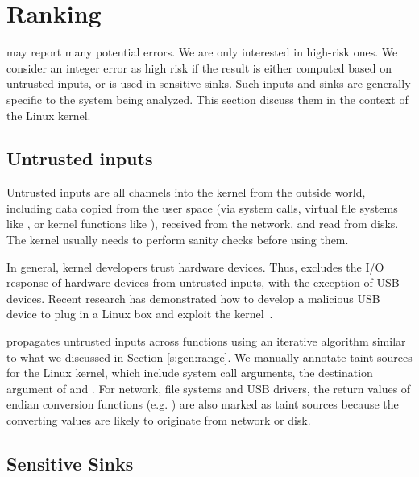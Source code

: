 \section{Ranking}
\label{s:rank}

\sys may report many potential errors.  We are only interested
in high-risk ones.  We consider an integer error as high risk if the
result is either computed based on untrusted inputs, or is used in
sensitive sinks.  Such inputs and sinks are generally specific to
the system being analyzed.  This section discuss them in the context
of the Linux kernel.

\subsection{Untrusted inputs}

Untrusted inputs are all channels into the kernel from the outside world,
including data copied from the user space (via system calls, virtual file
systems like , or kernel functions like ),
received from the network, and read from disks. The kernel usually needs to
perform sanity checks before using them. 

In general, kernel developers trust hardware devices. Thus, \sys
excludes the I/O response of hardware devices from untrusted inputs,
with the exception of USB devices.  Recent research has demonstrated
how to develop a malicious USB device to plug in a Linux box and
exploit the kernel~\cite{usb:buffer-overflow}.

\sys propagates untrusted inputs across functions using an iterative algorithm
similar to what we discussed in Section \ref{s:gen:range}. We manually annotate
taint sources for the Linux kernel, which include system call arguments, the
destination argument of  and . For network,
file systems and USB drivers, the return values of endian conversion functions
(e.g. ) are also marked as taint sources because the
converting values are likely to originate from network or disk.




\subsection{Sensitive Sinks}

